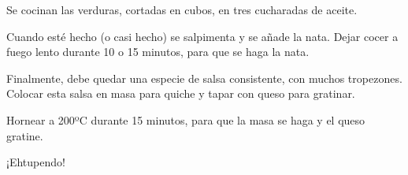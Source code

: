 Se cocinan
 las verduras, cortadas en cubos, en tres cucharadas de aceite.

Cuando esté hecho (o casi hecho) se salpimenta y se añade la nata.
Dejar cocer a fuego lento durante 10 o 15 minutos, para que se haga la nata.

Finalmente, debe quedar una especie de salsa consistente, con muchos tropezones.
Colocar esta salsa en masa para quiche y tapar con queso para gratinar.

Hornear a 200ºC durante 15 minutos, para que la masa se haga y el queso gratine.

¡Ehtupendo!
